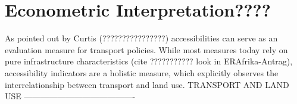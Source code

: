 %
%
%
%
%

\section{Econometric Interpretation????}

As pointed out by Curtis (????????????????) accessibilities can serve as an evaluation measure for transport 
policies. While most measures today rely on pure infrastructure characteristics (cite ??????????? look in ERAfrika-Antrag), 
accessibility indicators are a holistic measure, which explicitly observes the interrelationship between transport and land use.
TRANSPORT AND LAND USE ----------------------------------------

